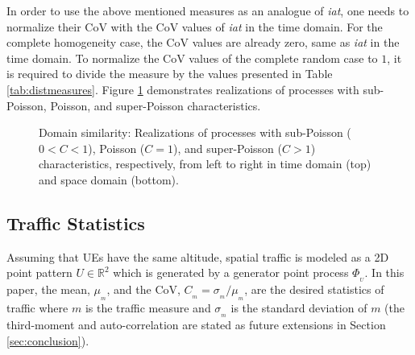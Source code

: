 \documentclass[journal]{IEEEtran}
\begin{document}
In order to use the above mentioned measures as an analogue of \textit{iat}, one needs to normalize their CoV with the CoV values of \textit{iat} in the time domain. For the complete homogeneity case, the CoV values are already zero, same as \textit{iat} in the time domain. To normalize the CoV values of the complete random case to $1$, it is required to divide the measure by the values presented in Table \ref{tab:distmeasures}. Figure \ref{fig:domainsimilarity} demonstrates realizations of processes with sub-Poisson, Poisson, and super-Poisson characteristics.

\begin{figure}
   \centering
   \vfill
   \hfill
   \hfill
   \hfill
   \caption{Domain similarity: Realizations of processes with sub-Poisson ($0 < C < 1$), Poisson ($C=1$), and super-Poisson ($ C > 1$) characteristics, respectively, from left to right in time domain (top) and space domain (bottom).}
   \label{fig:domainsimilarity}
\end{figure}



























\subsection{Traffic Statistics}
\label{subsec:statistics}

Assuming that UEs have the same altitude, spatial traffic is modeled as a 2D point pattern $U \in \mathbb{R}^{2}$ which is generated by a generator point process $\Phi_{_{U}}$. In this paper, the mean, $\mu_{_{m}}$, and the CoV, $C_{_{m}} = \sigma_{_{m}}/\mu_{_{m}}$, are the desired statistics of traffic where $m$ is the traffic measure and $\sigma_{_{m}}$ is the standard deviation of $m$ (the third-moment and auto-correlation are stated as future extensions in Section \ref{sec:conclusion}).
\end{document}
